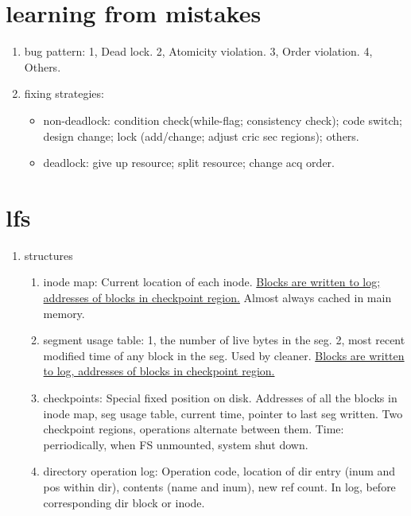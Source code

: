 \documentclass[9pt,conference]{IEEEtran}
\begin{document}
\section{learning from mistakes}
\label{sec-3}
\begin{enumerate}
\item bug pattern:
\label{sec-3-1}
1, Dead lock. 2, Atomicity violation. 3, Order violation. 4, Others.
\item fixing strategies:
\label{sec-3-2}
\begin{itemize}
\item non-deadlock: condition check(while-flag; consistency check); code switch; design change; lock (add/change; adjust cric sec regions); others.
\item deadlock: give up resource; split resource; change acq order.
\end{itemize}
\end{enumerate}
\section{lfs}
\label{sec-4}
\begin{enumerate}
\item structures
\label{sec-4-1}
\begin{enumerate}
\item inode map:
\label{sec-4-1-1}
Current location of each inode.
\uline{Blocks are written to log; addresses of blocks in checkpoint region.}
Almost always cached in main memory.
\item segment usage table:
\label{sec-4-1-2}
1, the number of live bytes in the seg.
2, most recent modified time of any block in the seg.
Used by cleaner.
\uline{Blocks are written to log, addresses of blocks in checkpoint region.}
\item checkpoints:
\label{sec-4-1-3}
Special fixed position on disk.
Addresses of all the blocks in inode map, seg usage table, current time, pointer to last seg written.
Two checkpoint regions, operations alternate between them.
Time: perriodically, when FS unmounted, system shut down.
\item directory operation log:
\label{sec-4-1-4}
Operation code, location of dir entry (inum and pos within dir), contents (name and inum), new ref count.
In log, before corresponding dir block or inode.
\end{enumerate}
\end{enumerate}
\end{document}
